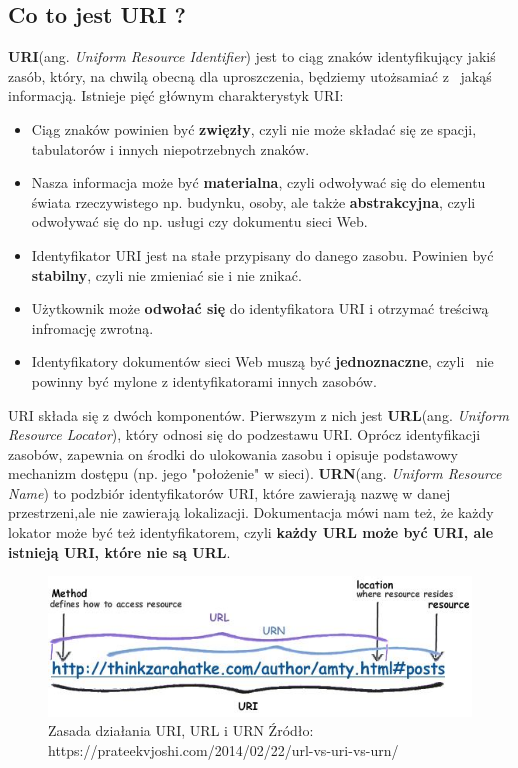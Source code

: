 \documentclass[oneside,polski,logo,indent]{amuthesis}
\begin{document}
\begin{center}
\subsection{Co to jest URI ?}
\end{center}
\textbf{URI}(ang. \emph{Uniform Resource Identifier}) jest to ciąg znaków identyfikujący jakiś zasób, który, na chwilą obecną dla uproszczenia, będziemy utożsamiać z~ jakąś informacją. Istnieje pięć głównym charakterystyk URI:
\begin{itemize}
\item Ciąg znaków powinien być \textbf{zwięzły}, czyli nie może składać się ze spacji, tabulatorów i innych niepotrzebnych znaków.\newline
\item Nasza informacja może być \textbf{materialna}, czyli odwoływać się do elementu świata rzeczywistego np. budynku, osoby, ale także \textbf{abstrakcyjna}, czyli odwoływać się do np. usługi czy dokumentu sieci Web.\newline
\item Identyfikator URI jest na stałe przypisany do danego zasobu. Powinien być \textbf{stabilny}, czyli nie zmieniać sie i nie znikać.\newline
\item Użytkownik może \textbf{odwołać się} do identyfikatora URI i otrzymać treściwą infromację zwrotną.\newline
\item Identyfikatory dokumentów sieci Web muszą być \textbf{jednoznaczne}, czyli~ nie powinny być mylone z identyfikatorami innych zasobów.\newline
\end{itemize}
URI składa się z dwóch komponentów. Pierwszym z nich jest \textbf{URL}(ang. \emph{Uniform Resource Locator}), który odnosi się do podzestawu URI. Oprócz identyfikacji zasobów, zapewnia on środki do ulokowania zasobu i opisuje podstawowy mechanizm dostępu (np. jego "położenie" w sieci). \textbf{URN}(ang. \emph{Uniform Resource Name}) to podzbiór identyfikatorów URI, które zawierają nazwę w danej przestrzeni,\break ale nie zawierają lokalizacji. Dokumentacja mówi nam też, że każdy lokator może być też identyfikatorem, czyli \textbf{każdy URL może być URI, ale istnieją URI, które nie są URL}.

\begin{figure}[H]
\centering
\includegraphics[width=14cm]{uri.jpg}
\caption{Zasada działania URI, URL i URN\newline
Źródło: https://prateekvjoshi.com/2014/02/22/url-vs-uri-vs-urn/}
\label{Cache}
\end{figure}
\end{document}
